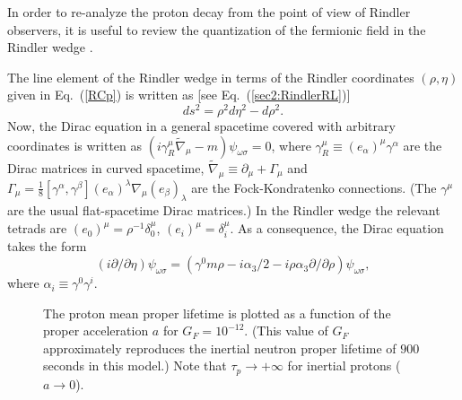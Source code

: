 \documentclass[12pt,nofootinbib,floatfix,aps,prd,showpacs,amsmath,amssymb,eqsecnum]{revtex4-2}
\begin{document}
In order to re-analyze the proton decay from the point of view of
Rindler observers, it is useful to review  the 
quantization of the fermionic field in the Rindler wedge
\cite{Candelasetal78,Soffeletal80,Jareguietal91,Bautista93}. 

The line element of the Rindler wedge in terms of the Rindler 
coordinates $(\rho,\eta)$ given in Eq.~(\ref{RCp}) is written as 
[see Eq.~(\ref{sec2:RindlerRL})]
\begin{equation}
ds^2 = \rho^2 d\eta^2 - d\rho^2  .
\label{LEp}
\end{equation}
Now, the Dirac equation in a general spacetime covered 
with arbitrary coordinates is written as 
$ (i\gamma_R^\mu \tilde \nabla_\mu -m) \psi_{\omega \sigma}=0$,
where
$\gamma_R^\mu \equiv (e_\alpha)^\mu \gamma^\alpha$
are the Dirac matrices in curved spacetime,
$\tilde \nabla_\mu \equiv \partial_\mu +\Gamma_\mu $
and 
$ \Gamma_\mu
= 
\frac{1}{8} [\gamma^\alpha,\gamma^\beta] (e_\alpha)^\lambda 
\nabla_\mu (e_\beta)_\lambda
$
are the 
Fock-Kondratenko connections. (The $\gamma^\mu$ are
the usual flat-spacetime Dirac matrices.) In the
Rindler wedge the relevant  tetrads are
$ (e_0)^{\mu}= \rho^{-1} \delta^\mu_0$, 
$ (e_i)^\mu = \delta^\mu_i$. 
As a consequence, the Dirac equation takes the form
\begin{equation}
(i {\partial }/{\partial \eta})\psi_{\omega \sigma}=
( 
\gamma^0 m\rho - {i \alpha_3}/{2} - 
i \rho \alpha_3 {\partial}/{\partial \rho}
)
\psi_{\omega \sigma},
\label{DEQ}
\end{equation}
where 
$\alpha_i \equiv \gamma^0 \gamma^i$. 
\begin{figure}
\begin{center}
\mbox{}
\end{center}
\caption{ 
The proton mean proper lifetime is plotted 
as a function of the proper acceleration $a$
for $G_F = 10^{-12}$. (This value of $G_F$
approximately reproduces the inertial neutron proper 
lifetime of $900$ seconds in this model.) 
Note that $\tau_p \to +\infty$ for inertial protons ($a \to 0$). 
}
\label{proton}
\end{figure}
\end{document}
